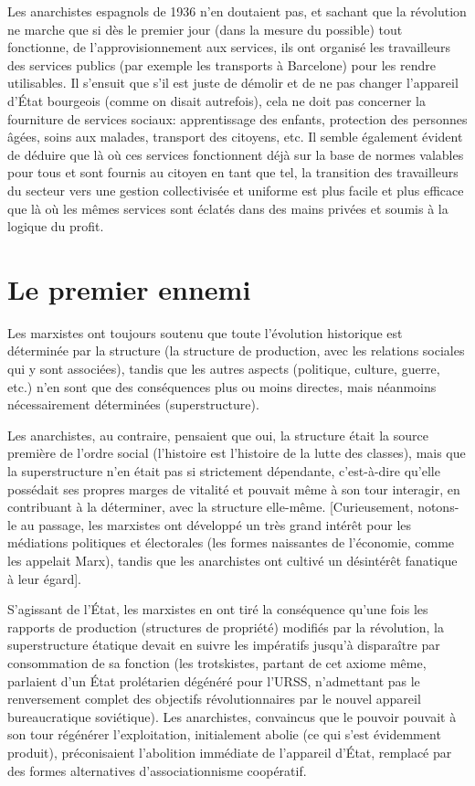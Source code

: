 Les anarchistes espagnols de 1936 n'en doutaient pas, et sachant que la révolution ne marche que si dès le premier jour (dans la mesure du possible) tout fonctionne, de l'approvisionnement aux services, ils ont organisé les travailleurs des services publics (par exemple les transports à Barcelone) pour les rendre utilisables. Il s'ensuit que s'il est juste de démolir et de ne pas changer l'appareil d'État bourgeois (comme on disait autrefois), cela ne doit pas concerner la fourniture de services sociaux: apprentissage des enfants, protection des personnes âgées, soins aux malades, transport des citoyens, etc. Il semble également évident de déduire que là où ces services fonctionnent déjà sur la base de normes valables pour tous et sont fournis au citoyen en tant que tel, la transition des travailleurs du secteur vers une gestion collectivisée et uniforme est plus facile et plus efficace que là où les mêmes services sont éclatés dans des mains privées et soumis à la logique du profit.

\section{Le premier ennemi}

Les marxistes ont toujours soutenu que toute l'évolution historique est déterminée par la structure (la structure de production, avec les relations sociales qui y sont associées), tandis que les autres aspects (politique, culture, guerre, etc.) n'en sont que des conséquences plus ou moins directes, mais néanmoins nécessairement déterminées (superstructure).

Les anarchistes, au contraire, pensaient que oui, la structure était la source première de l'ordre social (l'histoire est l'histoire de la lutte des classes), mais que la superstructure n'en était pas si strictement dépendante, c'est-à-dire qu'elle possédait ses propres marges de vitalité et pouvait même à son tour interagir, en contribuant à la déterminer, avec la structure elle-même. {[}Curieusement, notons-le au passage, les marxistes ont développé un très grand intérêt pour les médiations politiques et électorales (les formes naissantes de l'économie, comme les appelait Marx), tandis que les anarchistes ont cultivé un désintérêt fanatique à leur égard{]}.

S'agissant de l'État, les marxistes en ont tiré la conséquence qu'une fois les rapports de production (structures de propriété) modifiés par la révolution, la superstructure étatique devait en suivre les impératifs jusqu'à disparaître par consommation de sa fonction (les trotskistes, partant de cet axiome même, parlaient d'un État prolétarien dégénéré pour l'URSS, n'admettant pas le renversement complet des objectifs révolutionnaires par le nouvel appareil bureaucratique soviétique). Les anarchistes, convaincus que le pouvoir pouvait à son tour régénérer l'exploitation, initialement abolie (ce qui s'est évidemment produit), préconisaient l'abolition immédiate de l'appareil d'État, remplacé par des formes alternatives d'associationnisme coopératif.

